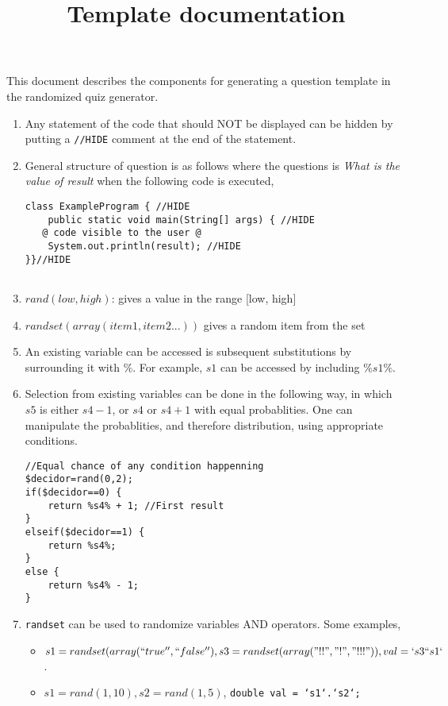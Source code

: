 \documentclass{article}
\begin{document}


\renewcommand{\labelenumi}{\alph{enumi}.}

\title{Template documentation}

This document describes the components for generating a question template in the randomized quiz generator.

\begin{enumerate}
\item Any statement of the code that should NOT be displayed can be hidden by putting a \texttt{//HIDE} comment at the end of the statement.
\item General structure of question is as follows where the questions is \emph{What is the value of result} when the following code is executed,

\begin{lstlisting}[style=buggy]
class ExampleProgram { //HIDE
    public static void main(String[] args) { //HIDE
   @ code visible to the user @
    System.out.println(result); //HIDE
}}//HIDE
	
\end{lstlisting}

\item $rand(low, high)$: gives a value in the range [low, high]
\item $randset(array(item1, item2...))$ gives a random item from the set
\item An existing variable can be accessed is subsequent substitutions by surrounding it with \%. For example, $s1$ can be accessed by including $\%s1\%$.
\item Selection from existing variables can be done in the following way, in which $s5$ is either $s4 - 1$, or $s4$ or $s4 + 1$ with equal probablities. One can manipulate the probablities, and therefore distribution, using appropriate conditions.
\begin{lstlisting}
//Equal chance of any condition happenning
$decidor=rand(0,2);
if($decidor==0) {
    return %s4% + 1; //First result
}
elseif($decidor==1) {
    return %s4%;
}
else {
    return %s4% - 1;
}
\end{lstlisting}

\item \texttt{randset} can be used to randomize variables AND operators. Some examples,
\begin{itemize}
\item $s1 = randset(array(``true'', ``false''), s3 = randset(array("!!","!","!!!")), val = `s3``s1`$.
\item $s1 = rand(1, 10), s2 = rand(1, 5)$, \texttt{double val = `s1`.`s2`;}
\end{itemize}
\end{enumerate}
\end{document}
